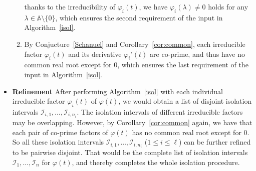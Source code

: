 \documentclass[a4paper,UKenglish,cleveref,autoref,thm-restate,authorcolumns]{lipics-v2019}
\newcommand{\I}{\mathcal{I}}
\begin{document}
\begin{itemize}
\begin{enumerate}
        thanks to the irreducibility of $\varphi_i(t)$,
	    we have $\varphi_i(\lambda) \ne 0$ holds for any $\lambda\in\mathbb{A}\setminus\{0\}$,
	    which ensures the second requirement of the input in Algorithm~\ref{isol}. 
	    \item By Conjucture~\ref{Schanuel} and Corollary~\ref{cor:common},
        each irreducible factor $\varphi_i(t)$ and its derivative $\varphi_i'(t)$
		are co-prime,
		and thus have no common real root except for $0$,
		which ensures the last requirement of the input in Algorithm~\ref{isol}.
	\end{enumerate}
	\item \textbf{Refinement}
		After performing Algorithm~\ref{isol}
		with each individual irreducible factor $\varphi_i(t)$ of $\varphi(t)$,
		we would obtain a list of disjoint isolation intervals $\I_{i,1},\ldots,\I_{i,n_i}$.
		The isolation intervals of different irreducible factors may be overlapping.
		However, by Corollary~\ref{cor:common} again,
		we have that
		each pair of co-prime factors of $\varphi(t)$ has no common real root except for $0$.
        So all these isolation intervals $\I_{i,1},\ldots,\I_{i,n_i}$ ($1 \le i \le \ell$)
		can be further refined to be pairwise disjoint.
		That would be the complete list of isolation intervals $\I_1,\ldots,\I_n$ for $\varphi(t)$,
		and thereby completes the whole isolation procedure.
\end{itemize}
\end{document}

